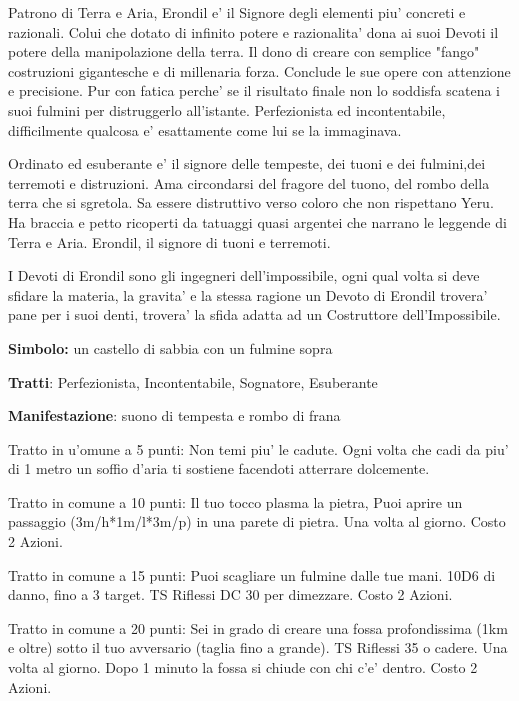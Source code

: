 \documentclass[a4paper,11pt,twoside,openany]{book}
\begin{document}
{\label{erondil}

Patrono di Terra e Aria, Erondil e' il Signore degli elementi piu' concreti e razionali. Colui che dotato di infinito potere e razionalita' dona ai suoi Devoti il potere della manipolazione della terra. Il dono di creare con semplice "fango" costruzioni gigantesche e di millenaria forza. Conclude le sue opere con attenzione e precisione. Pur con fatica perche' se il risultato finale non lo soddisfa scatena i suoi fulmini per distruggerlo all'istante. Perfezionista ed incontentabile, difficilmente qualcosa e' esattamente come lui se la immaginava. 

Ordinato ed esuberante e' il signore delle tempeste, dei tuoni e dei fulmini,dei terremoti e distruzioni. Ama circondarsi del fragore del tuono, del rombo della terra che si sgretola. Sa essere distruttivo verso coloro che non rispettano Yeru.
Ha braccia e petto ricoperti da tatuaggi quasi argentei che narrano le leggende di Terra e Aria. Erondil, il signore di tuoni e terremoti.


I Devoti di Erondil sono gli ingegneri dell'impossibile, ogni qual volta si deve sfidare la materia, la gravita' e la stessa ragione un Devoto di Erondil trovera' pane per i suoi denti, trovera' la sfida adatta ad un Costruttore dell'Impossibile.

\textbf{Simbolo:} un castello di sabbia con un fulmine sopra

\textbf{Tratti}: Perfezionista, Incontentabile, Sognatore, Esuberante

\textbf{Manifestazione}: suono di tempesta e rombo di frana

\bigskip

Tratto in u'omune a 5 punti: Non temi piu' le cadute. Ogni volta che cadi da piu' di 1 metro un soffio d'aria ti sostiene facendoti atterrare dolcemente.

Tratto in comune a 10 punti: Il tuo tocco plasma la pietra, Puoi aprire un passaggio (3m/h{*}1m/l{*}3m/p) in una parete di pietra. Una volta al giorno. Costo 2 Azioni.

Tratto in comune a 15 punti: Puoi scagliare un fulmine dalle tue mani. 10D6 di danno, fino a 3 target. TS Riflessi DC 30 per dimezzare. Costo 2 Azioni.

Tratto in comune a 20 punti: Sei in grado di creare una fossa profondissima (1km e oltre) sotto il tuo avversario (taglia fino a grande). TS Riflessi 35 o cadere. Una volta al giorno. Dopo 1 minuto la fossa si chiude con chi c'e' dentro. Costo 2 Azioni.

}
\end{document}
